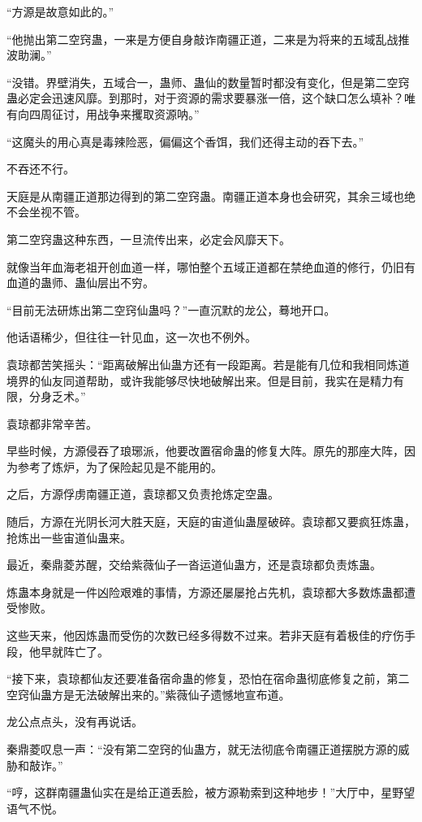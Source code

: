 \begin{this_body}
“方源是故意如此的。”

“他抛出第二空窍蛊，一来是方便自身敲诈南疆正道，二来是为将来的五域乱战推波助澜。”

“没错。界壁消失，五域合一，蛊师、蛊仙的数量暂时都没有变化，但是第二空窍蛊必定会迅速风靡。到那时，对于资源的需求要暴涨一倍，这个缺口怎么填补？唯有向四周征讨，用战争来攫取资源呐。”

“这魔头的用心真是毒辣险恶，偏偏这个香饵，我们还得主动的吞下去。”

不吞还不行。

天庭是从南疆正道那边得到的第二空窍蛊。南疆正道本身也会研究，其余三域也绝不会坐视不管。

第二空窍蛊这种东西，一旦流传出来，必定会风靡天下。

就像当年血海老祖开创血道一样，哪怕整个五域正道都在禁绝血道的修行，仍旧有血道的蛊师、蛊仙层出不穷。

“目前无法研炼出第二空窍仙蛊吗？”一直沉默的龙公，蓦地开口。

他话语稀少，但往往一针见血，这一次也不例外。

袁琼都苦笑摇头：“距离破解出仙蛊方还有一段距离。若是能有几位和我相同炼道境界的仙友同道帮助，或许我能够尽快地破解出来。但是目前，我实在是精力有限，分身乏术。”

袁琼都非常辛苦。

早些时候，方源侵吞了琅琊派，他要改置宿命蛊的修复大阵。原先的那座大阵，因为参考了炼炉，为了保险起见是不能用的。

之后，方源俘虏南疆正道，袁琼都又负责抢炼定空蛊。

随后，方源在光阴长河大胜天庭，天庭的宙道仙蛊屋破碎。袁琼都又要疯狂炼蛊，抢炼出一些宙道仙蛊来。

最近，秦鼎菱苏醒，交给紫薇仙子一沓运道仙蛊方，还是袁琼都负责炼蛊。

炼蛊本身就是一件凶险艰难的事情，方源还屡屡抢占先机，袁琼都大多数炼蛊都遭受惨败。

这些天来，他因炼蛊而受伤的次数已经多得数不过来。若非天庭有着极佳的疗伤手段，他早就阵亡了。

“接下来，袁琼都仙友还要准备宿命蛊的修复，恐怕在宿命蛊彻底修复之前，第二空窍仙蛊方是无法破解出来的。”紫薇仙子遗憾地宣布道。

龙公点点头，没有再说话。

秦鼎菱叹息一声：“没有第二空窍的仙蛊方，就无法彻底令南疆正道摆脱方源的威胁和敲诈。”

“哼，这群南疆蛊仙实在是给正道丢脸，被方源勒索到这种地步！”大厅中，星野望语气不悦。


\end{this_body}
